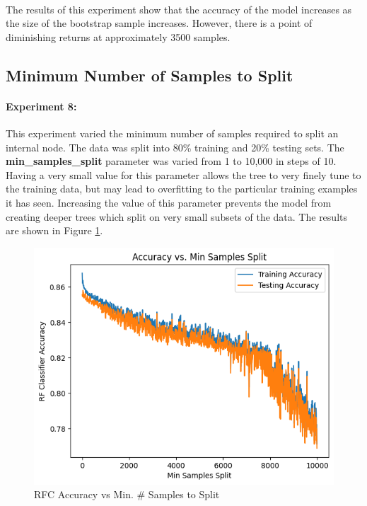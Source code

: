 \documentclass[12pt, letterpaper]{article}
\begin{document}
\paragraph*{}The results of this experiment show that the accuracy of the model
increases as the size of the bootstrap sample increases. However, there is a point
of diminishing returns at approximately 3500 samples.

\subsection{Minimum Number of Samples to Split}

\paragraph*{Experiment 8:}This experiment varied the minimum number of samples
required to split an internal node. The data was split into 80\% training and
20\% testing sets. The \textbf{min\_samples\_split} parameter was varied from 1 to
10,000 in steps of 10. Having a very small value for this parameter allows the tree
to very finely tune to the training data, but may lead to overfitting to the particular
training examples it has seen. Increasing the value of this parameter prevents the
model from creating deeper trees which split on very small subsets of the data.
The results are shown in Figure \ref{fig:rf7}.

\begin{figure}[ht]
    \centering
    \includegraphics[width=\textwidth]{rf/rf12.png} %
    \caption{RFC Accuracy vs Min. \# Samples to Split}
    \label{fig:rf7}
\end{figure}
\end{document}
